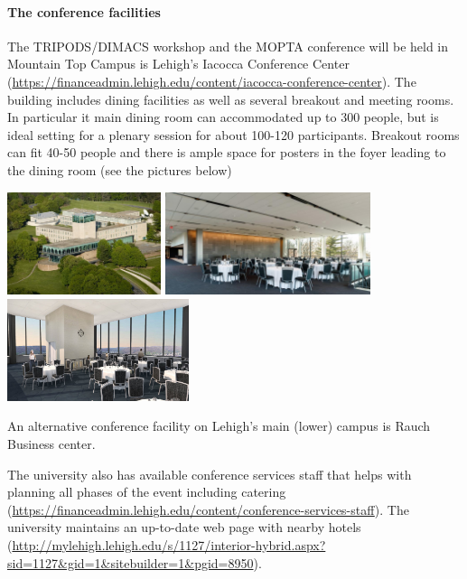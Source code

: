\paragraph{The conference facilities} The TRIPODS/DIMACS workshop and the MOPTA conference will be held in Mountain Top Campus is Lehigh's Iacocca Conference Center (\url{https://financeadmin.lehigh.edu/content/iacocca-conference-center}). The building includes dining facilities as well as several breakout and meeting rooms. In particular it main dining room can accommodated up to 300 people, but is ideal setting for a plenary session for about 100-120 participants. Breakout rooms can fit 40-50 people and there is ample space for posters in the foyer leading to the dining room (see the pictures below)
\begin{center}
\includegraphics[height=3cm]{Iacocca_Aerial.jpg}
\includegraphics[height=3cm]{wdr.jpg}
\includegraphics[height=3cm]{Tower_92717.jpg}



\end{center}




An alternative conference facility on Lehigh's main (lower) campus is Rauch Business center. 

The university also has available conference services staff that helps with planning all phases of the event including catering (\url{https://financeadmin.lehigh.edu/content/conference-services-staff}). The university maintains an up-to-date web page with nearby hotels (\url{http://mylehigh.lehigh.edu/s/1127/interior-hybrid.aspx?sid=1127&gid=1&sitebuilder=1&pgid=8950}). 



